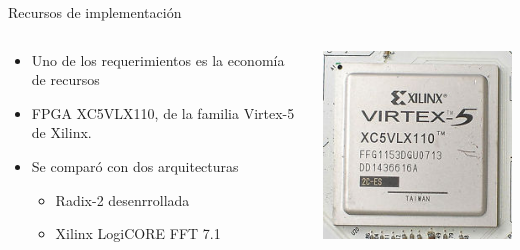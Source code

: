 \begin{frame}{Recursos de implementación}
    \begin{columns}[T]
      \begin{column}{.53\textwidth}
      \begin{itemize}
        \item<1-> Uno de los requerimientos es la economía de recursos
        \item<2-> FPGA XC5VLX110, de la familia Virtex-5 de Xilinx.
        \item<3-> Se comparó con dos arquitecturas
        \begin{itemize}
          \item<4-> Radix-2 desenrrollada
          \item<5-> Xilinx LogiCORE FFT 7.1
        \end{itemize}
      \end{itemize}
      \end{column}
      \begin{column}{.47\textwidth}
        \centering
        \begin{center}
		  \advance\leftskip-0.2cm
		  \includegraphics[scale=0.32]{./figures/virtex_chip.jpg}
		\end{center}
      \end{column}
    \end{columns}
\end{frame}

